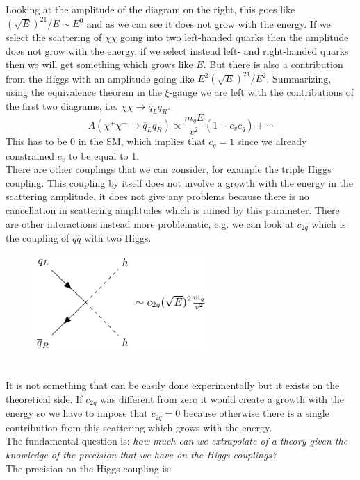 \documentclass[../main.tex]{subfiles}
\begin{document}
Looking at the amplitude of the diagram on the right, this goes like $(\sqrt{E})^21/E\sim E^0$ and as we can see it does not grow with the energy. If we select the scattering of $\chi\chi$ going into two left-handed quarks then the amplitude does not grow with the energy, if we select instead left- and right-handed quarks then we will get something which grows like $E$. But there is also a contribution from the Higgs with an amplitude going like $E^2(\sqrt{E})^21/E^2$. Summarizing, using the equivalence theorem in the $\xi$-gauge we are left with the contributions of the first two diagrams, i.e. $\chi\chi\to\overline{q}_Lq_R$.
\[
A(\chi^+\chi^-\to\overline{q}_Lq_R)\propto\frac{m_qE}{v^2}(1-c_vc_q)+\cdots
\]
This has to be 0 in the SM, which implies that $c_q=1$ since we already constrained $c_v$ to be equal to 1.\\
There are other couplings that we can consider, for example the triple Higgs coupling. This coupling by itself does not involve a growth with the energy in the scattering amplitude, it does not give any problems because there is no cancellation in scattering amplitudes which is ruined by this parameter. There are other interactions instead more problematic, e.g. we can look at $c_{2q}$ which is the coupling of $q\overline{q}$ with two Higgs.
\begin{figure}[h]
    \centering
    \includegraphics[width=0.6\textwidth]{Images/c2q.pdf}
    \caption*{}
\end{figure}\\
It is not something that can be easily done experimentally but it exists on the theoretical side. If $c_{2q}$ was different from zero it would create a growth with the energy so we have to impose that $c_{2q}=0$ because otherwise there is a single contribution from this scattering which grows with the energy.\\
The fundamental question is: \textit{how much can we extrapolate of a theory given the knowledge of the precision that we have on the Higgs couplings?}\\
The precision on the Higgs coupling is:
\end{document}
